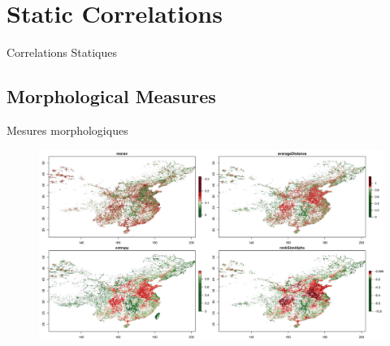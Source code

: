 




\newpage

\section{Static Correlations}{Correlations Statiques}

\label{app:sec:staticcorrelations}



\subsection{Morphological Measures}{Mesures morphologiques}


%




\begin{figure}
\includegraphics[width=\linewidth]{Figures/Final/A-staticcorrelations-morphocn.jpg}
\end{figure}


